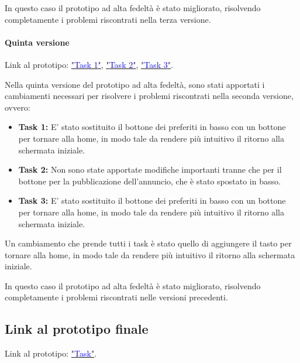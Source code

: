 \documentclass{article}
\begin{document}
In questo caso il prototipo ad alta fedeltà è stato migliorato, risolvendo completamente i problemi riscontrati nella terza versione.

\paragraph{Quinta versione}
\mbox{}
\newline
Link al prototipo: \href{https://www.figma.com/proto/xET26iTanAxBERu0jhT0FS/Task?node-id=247-1739&t=tFj5EITPxXz78FJi-1}{"\textcolor{blue}{Task 1}"}, \href{https://www.figma.com/proto/xET26iTanAxBERu0jhT0FS/Task?node-id=247-3067&t=tFj5EITPxXz78FJi-1}{"\textcolor{blue}{Task 2}"}, \href{https://www.figma.com/proto/xET26iTanAxBERu0jhT0FS/Task?node-id=247-7474&t=tFj5EITPxXz78FJi-1}{"\textcolor{blue}{Task 3}"}.

Nella quinta versione del prototipo ad alta fedeltà, sono stati apportati i cambiamenti necessari per risolvere i problemi riscontrati nella seconda versione, ovvero:
\begin{itemize}
    \item \textbf{Task 1:} E' stato sostituito il bottone dei preferiti in basso con un bottone per tornare alla home, in modo tale da rendere più intuitivo il ritorno alla schermata iniziale.
    \item \textbf{Task 2:} Non sono state apportate modifiche importanti tranne che per il bottone per la pubblicazione dell'annuncio, che è stato spostato in basso.
    \item \textbf{Task 3:} E' stato sostituito il bottone dei preferiti in basso con un bottone per tornare alla home, in modo tale da rendere più intuitivo il ritorno alla schermata iniziale.
\end{itemize}

Un cambiamento che prende tutti i task è stato quello di aggiungere il tasto per tornare alla home, in modo tale da rendere più intuitivo il ritorno alla schermata iniziale.

In questo caso il prototipo ad alta fedeltà è stato migliorato, risolvendo completamente i problemi riscontrati nelle versioni precedenti.

\subsection{Link al prototipo finale}

Link al prototipo: \href{https://www.figma.com/proto/xET26iTanAxBERu0jhT0FS/Task?node-id=308-1192&t=lyg6lHmhibAaboIM-1}{"\textcolor{blue}{Task}"}.
\end{document}
